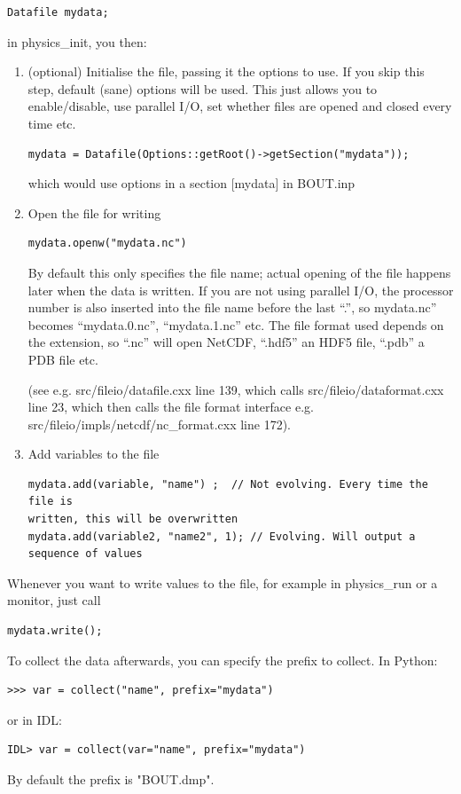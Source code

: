 \documentclass[12pt]{article}
\begin{document}
%
\begin{lstlisting}
Datafile mydata;
\end{lstlisting}
%
in physics\_init, you then:

%
\begin{enumerate}
\item (optional) Initialise the file, passing it the options to use. If you
    skip this step, default (sane) options will be used. This just allows you
    to enable/disable, use parallel I/O, set whether files are opened and
    closed every time etc.
%
\begin{lstlisting}
mydata = Datafile(Options::getRoot()->getSection("mydata"));
\end{lstlisting}
%
which would use options in a section [mydata] in BOUT.inp

\item Open the file for writing
%
\begin{lstlisting}
mydata.openw("mydata.nc")
\end{lstlisting}
%
By default this only specifies the file name; actual opening of the file
happens later when the data is written. If you are not using parallel I/O, the
processor number is also inserted into the file name before the last ``.'', so
mydata.nc'' becomes ``mydata.0.nc'', ``mydata.1.nc'' etc. The file format used
depends on the extension, so ``.nc'' will open NetCDF, ``.hdf5'' an HDF5 file,
``.pdb'' a PDB file etc.

(see e.g. src/fileio/datafile.cxx line 139, which calls
src/fileio/dataformat.cxx line 23, which then calls the file format interface
e.g. src/fileio/impls/netcdf/nc\_format.cxx line 172).

\item Add variables to the file
%
\begin{lstlisting}
mydata.add(variable, "name") ;  // Not evolving. Every time the file is 
written, this will be overwritten
mydata.add(variable2, "name2", 1); // Evolving. Will output a sequence of values
\end{lstlisting}
%
\end{enumerate}
%
Whenever you want to write values to the file, for example in physics\_run or a
monitor, just call
%
\begin{lstlisting}
mydata.write();
\end{lstlisting}
%
To collect the data afterwards, you can specify the prefix to collect. In
Python:
%
\begin{verbatim}
>>> var = collect("name", prefix="mydata")
\end{verbatim}
%
or in IDL:
%
\begin{verbatim}
IDL> var = collect(var="name", prefix="mydata")
\end{verbatim}
%
By default the prefix is "BOUT.dmp".
\end{document}
